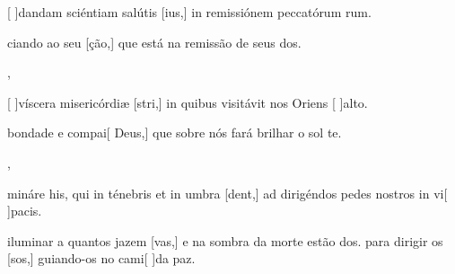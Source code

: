 {  {\item {}[ ]{dan}dam sciéntiam salútis [ius,] in remissiónem peccatórum rum.}%
    {\item {}ciando ao seu [ção,] que está na remissão de seus dos.},
  {\item {}[ ]{ví}scera misericórdiæ [stri,] in quibus visitávit nos Oriens [ ]{al}to.}%
    {\item {} bondade e compai[ Deus,] que sobre nós fará brilhar o sol te.},
  {\item {}mináre his, qui in ténebris et in umbra [dent,] ad dirigéndos pedes nostros in vi[ ]{pa}cis.}%
    {\item {} iluminar a quantos jazem [vas,] e na sombra da morte estão dos.  para dirigir os [sos,] guiando-os no cami[ ]{da} paz.}
}